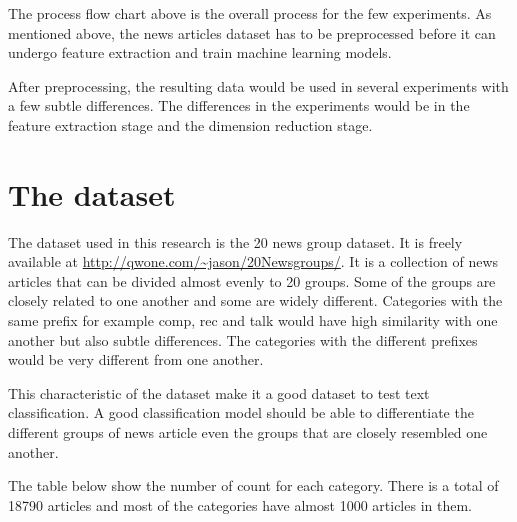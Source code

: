 The process flow chart above is the overall process for the few experiments. As mentioned above, the news articles dataset has to be preprocessed before it can undergo feature extraction and train machine learning models.

After preprocessing, the resulting data would be used in several experiments with a few subtle differences.
The differences in the experiments would be in the feature extraction stage and the dimension reduction stage. 

\clearpage
\section{The dataset}
\graphicspath{{./images/}}

The dataset used in this research is the 20 news group dataset. It is freely available at \url{http://qwone.com/~jason/20Newsgroups/}. It is a collection of news articles that can be divided almost evenly to 20 groups. Some of the groups are closely related to one another and some are widely different. Categories with the same prefix for example comp, rec and talk would have high similarity with one another but also subtle differences. The categories with the different prefixes would be very different from one another.

This characteristic of the dataset make it a good dataset to test text classification. A good classification model should be able to differentiate the different groups of news article even the groups that are closely resembled one another.

The table below show the number of count for each category. There is a total of 18790 articles and most of the categories have almost 1000 articles in them. 

